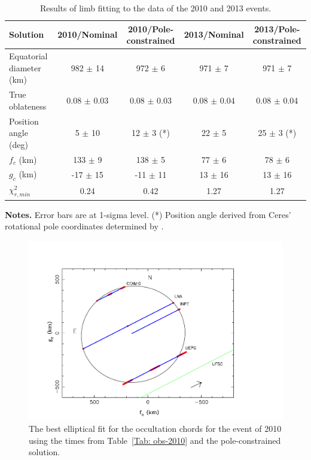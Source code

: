 \documentclass[useAMS,usenatbib]{mn2e}
\begin{document}
\begin{table}
 \centering
 \begin{minipage}{140mm}
  \caption{Results of limb fitting to the data of the 2010 and 2013 events.\label{Tab: results}}
  \begin{tabular}{@{}lcccc}
  \hline
     Solution & 2010/Nominal & 2010/Pole-constrained & 2013/Nominal & 2013/Pole-constrained \\
\hline
Equatorial diameter (km) & 982 $\pm$ 14 & 972 $\pm$ 6  & 971 $\pm$ 7  & 971 $\pm$ 7\\
True oblateness        & 0.08 $\pm$ 0.03 & 0.08 $\pm$ 0.03 & 0.08 $\pm$ 0.04 & 0.08 $\pm$ 0.04\\
Position angle (deg)   & 5 $\pm$ 10    & 12 $\pm$ 3 (*)& 22 $\pm$ 5    & 25 $\pm$ 3 (*)\\
$f_c$ (km)             & 133 $\pm$ 9   & 138 $\pm$ 5   & 77 $\pm$ 6    & 78 $\pm$ 6\\
$g_c$ (km)             & -17 $\pm$ 15  & -11 $\pm$ 11  & 13 $\pm$ 16   & 13 $\pm$ 16\\
$\chi^2_{r,min}$       & 0.24          &  0.42         & 1.27          & 1.27\\
\hline
\end{tabular}
\textbf{Notes.} Error bars are at 1-sigma level.
(*) Position angle derived from Ceres' rotational pole coordinates determined by \cite{Drummond2014}.
\end{minipage}
\end{table}

\begin{figure}
\includegraphics[scale=0.36]{figures/Ceres_2010_body.pdf} 
\caption{The best elliptical fit for the occultation chords for the event of 2010 using the times from Table~\ref{Tab: obs-2010} and the pole-constrained solution. \label{Fig:Ceres-2010-body}}
\end{figure}
\end{document}
